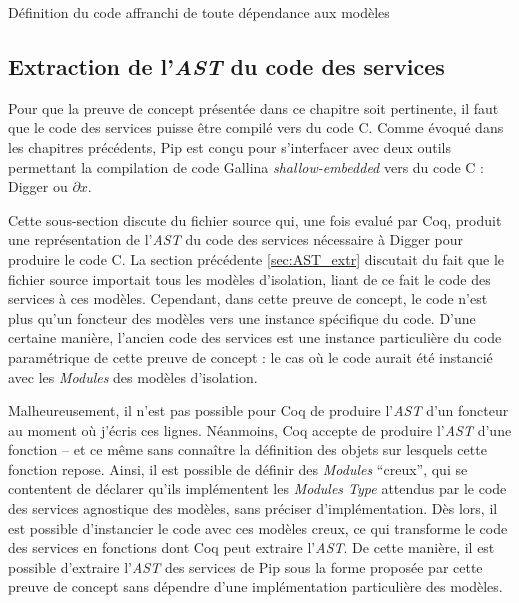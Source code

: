 	\begin{listing}[!ht]
		\caption{Définition du code affranchi de toute dépendance aux modèles}
		\label{code:ModelAgnosticCode}
	\end{listing}

		\subsection{Extraction de l'\emph{AST} du code des services}

		Pour que la preuve de concept présentée dans ce chapitre soit pertinente, il faut que le code des services puisse être compilé vers du code C. Comme évoqué dans les chapitres précédents, Pip est conçu pour s'interfacer avec deux outils permettant la compilation de code Gallina \emph{shallow-embedded} vers du code C : Digger ou $\partial x$.

		Cette sous-section discute du fichier source qui, une fois evalué par Coq, produit une représentation de l'\emph{AST} du code des services nécessaire à Digger pour produire le code C. La section précédente \ref{sec:AST_extr} discutait du fait que le fichier source importait tous les modèles d'isolation, liant de ce fait le code des services à ces modèles. Cependant, dans cette preuve de concept, le code n'est plus qu'un foncteur des modèles vers une instance spécifique du code. D'une certaine manière, l'ancien code des services est une instance particulière du code paramétrique de cette preuve de concept : le cas où le code aurait été instancié avec les \emph{Modules} des modèles d'isolation.

		Malheureusement, il n'est pas possible pour Coq de produire l'\emph{AST} d'un foncteur au moment où j'écris ces lignes. Néanmoins, Coq accepte de produire l'\emph{AST} d'une fonction -- et ce même sans connaître la définition des objets sur lesquels cette fonction repose. Ainsi, il est possible de définir des \emph{Modules} ``creux'', qui se contentent de déclarer qu'ils implémentent les \emph{Modules Type} attendus par le code des services agnostique des modèles, sans préciser d'implémentation. Dès lors, il est possible d'instancier le code avec ces modèles creux, ce qui transforme le code des services en fonctions dont Coq peut extraire l'\emph{AST}. De cette manière, il est possible d'extraire l'\emph{AST} des services de Pip sous la forme proposée par cette preuve de concept sans dépendre d'une implémentation particulière des modèles.

